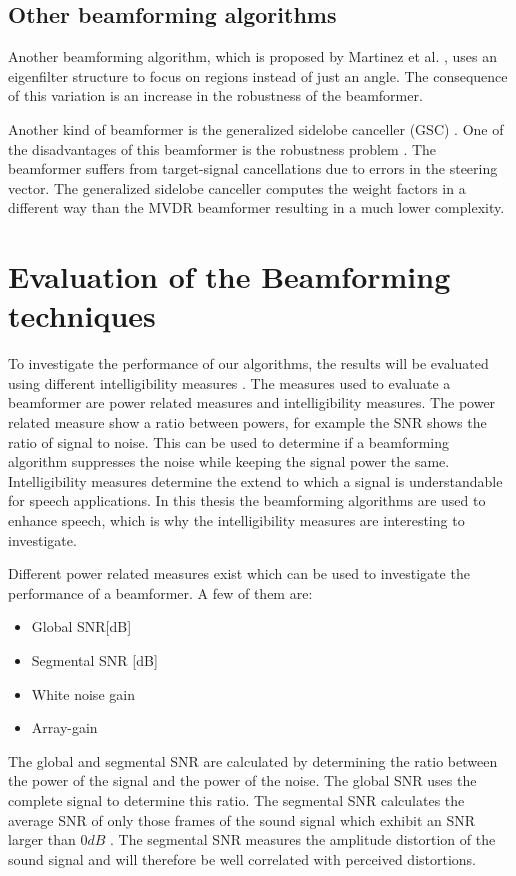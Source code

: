 \subsection{Other beamforming algorithms}
Another beamforming algorithm, which is proposed by Martinez et al. \cite{martinez2015}, uses an eigenfilter structure to focus on regions instead of just an angle. The consequence of this variation is an increase in the robustness of the beamformer.

Another kind of beamformer is the generalized sidelobe canceller (GSC) \cite{griffiths1982}. One of the disadvantages of this beamformer is the robustness problem \cite{brandstein2001}. The beamformer suffers from target-signal cancellations due to errors in the steering vector. The generalized sidelobe canceller computes the weight factors in a different way than the MVDR beamformer resulting in a much lower complexity.

\section{Evaluation of the Beamforming techniques}
To investigate the performance of our algorithms, the results will be evaluated using different intelligibility measures \cite{taal2010,rix2001}.
The measures used to evaluate a beamformer are power related measures and intelligibility measures. The power related measure show a ratio between powers, for example the SNR shows the ratio of signal to noise. This can be used to determine if a beamforming algorithm suppresses the noise while keeping the signal power the same. Intelligibility measures determine the extend to which a signal is understandable for speech applications. In this thesis the beamforming algorithms are used to enhance speech, which is why the intelligibility measures are interesting to investigate.

Different power related measures exist which can be used to investigate the performance of a beamformer. A few of them are:

\begin{itemize}
\item Global SNR[dB]
\item Segmental SNR [dB]
\item White noise gain
\item Array-gain
\end{itemize}

The global and segmental SNR are calculated by determining the ratio between the power of the signal and the power of the noise. The global SNR uses the complete signal to determine this ratio. The segmental SNR calculates the average SNR of only those frames of the sound signal which exhibit an SNR larger than $0 dB$ \cite{brandstein2001}. The segmental SNR measures the amplitude distortion of the sound signal and will therefore be well correlated with perceived distortions. 


